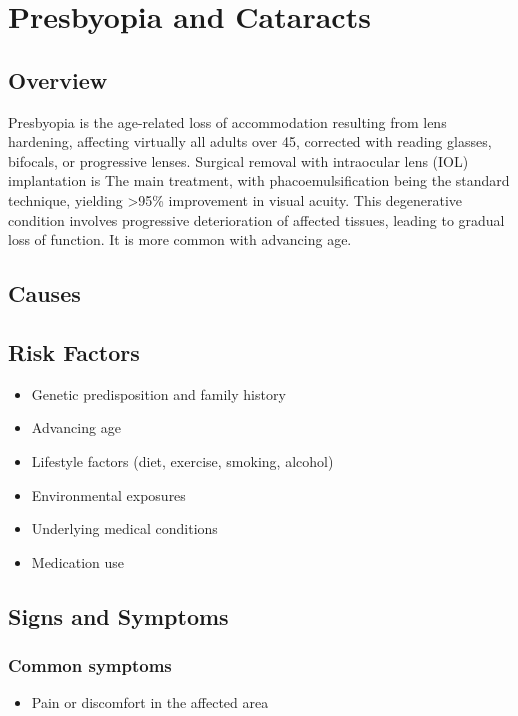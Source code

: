 \chapter{Presbyopia and Cataracts}
\label{sec:Presbyopia and Cataracts}

\section{Overview}
Presbyopia is the age-related loss of accommodation resulting from lens hardening, affecting virtually all adults over 45, corrected with reading glasses, bifocals, or progressive lenses. Surgical removal with intraocular lens (IOL) implantation is The main treatment, with phacoemulsification being the standard technique, yielding >95\% improvement in visual acuity. This degenerative condition involves progressive deterioration of affected tissues, leading to gradual loss of function. It is more common with advancing age.
\section{Causes}
\section{Risk Factors}

\begin{itemize}[noitemsep]
  \item Genetic predisposition and family history
  \item Advancing age
  \item Lifestyle factors (diet, exercise, smoking, alcohol)
  \item Environmental exposures
  \item Underlying medical conditions
  \item Medication use
\end{itemize}
\section{Signs and Symptoms}

\subsection{Common symptoms}
\begin{itemize}[noitemsep]
  \item Pain or discomfort in the affected area
  \end{itemize}

